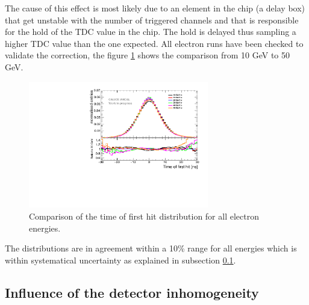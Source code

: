 \documentclass[twoside,a4paper,11pt]{article}
\begin{document}
The cause of this effect is most likely due to an element in the chip (a delay box) that get unstable with the number of triggered channels and that is responsible for the hold of the TDC value in the chip. The hold is delayed thus sampling a higher TDC value than the one expected.
All electron runs have been checked to validate the correction, the figure \ref{fig:all_electron_energies} shows the comparison from 10 GeV to 50 GeV.
\begin{figure}[htbp]
\begin{center}
\includegraphics[width=0.7\textwidth]{fig/Electrons/ComparisonDataEnergies.pdf}
\caption{Comparison of the time of first hit distribution for all electron energies.}
\label{fig:all_electron_energies}
\end{center}
\end{figure}
The distributions are in agreement within a 10\% range for all energies which is within systematical uncertainty as explained in subsection \ref{subsec:det_inhomo}.

\subsection{Influence of the detector inhomogeneity}
\label{subsec:det_inhomo}
\end{document}
